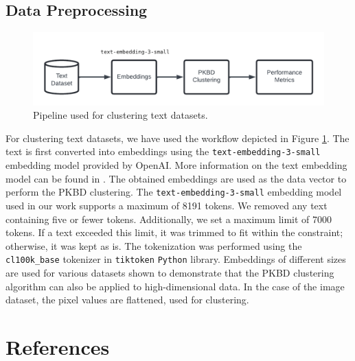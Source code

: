 \documentclass{article}
\begin{document}
\subsection*{Data Preprocessing}

\begin{figure}[H]
    \centering
    \includegraphics[width=\linewidth]{images/Workflow.pdf}
    \caption{Pipeline used for clustering text datasets.}
    \label{fig:pipeline}
\end{figure}

For clustering text datasets, we have used the workflow depicted in Figure \ref{fig:pipeline}. The text is first converted into embeddings using the \texttt{text-embedding-3-small} embedding model provided by OpenAI. More information on the text embedding model can be found in \cite{Vectorem72:online}. The obtained embeddings are used as the data vector to perform the PKBD clustering. The \texttt{text-embedding-3-small} embedding model used in our work supports a maximum of 8191 tokens. We removed any text containing five or fewer tokens. Additionally, we set a maximum limit of 7000 tokens. If a text exceeded this limit, it was trimmed to fit within the constraint; otherwise, it was kept as is. The tokenization was performed using the \texttt{cl100k\_base} tokenizer in \texttt{tiktoken} \texttt{Python} library. Embeddings of different sizes are used for various datasets shown to demonstrate that the PKBD clustering algorithm can also be applied to high-dimensional data. In the case of the image dataset, the pixel values are flattened, used for clustering. 

\section{References}
\end{document}
